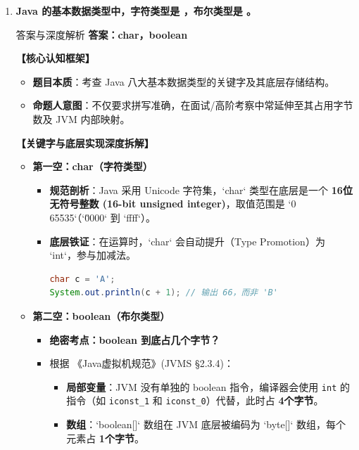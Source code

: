 \documentclass[12pt, a4paper]{ctexart}
\newcommand{\blank}{\underline{\hspace{3cm}}}
\begin{document}
\begin{enumerate}[label=\textbf{\arabic*.}]
	\item \textbf{Java 的基本数据类型中，字符类型是 \blank，布尔类型是 \blank。}

	      \begin{bluebox}{答案与深度解析}
		      \textbf{答案：char，boolean}

		      \textbf{【核心认知框架】}
		      \begin{itemize}[leftmargin=*, nosep]
			      \item \textbf{题目本质}：考查 Java 八大基本数据类型的关键字及其底层存储结构。
			      \item \textbf{命题人意图}：不仅要求拼写准确，在面试/高阶考察中常延伸至其占用字节数及 JVM 内部映射。
		      \end{itemize}

		      \textbf{【关键字与底层实现深度拆解】}
		      \begin{itemize}[leftmargin=*, nosep]

			      \item \textbf{第一空：char（字符类型）}
			            \begin{itemize}[leftmargin=*, nosep]
				            \item \textbf{规范剖析}：Java 采用 Unicode 字符集，`char` 类型在底层是一个 \textbf{16位无符号整数 (16-bit unsigned integer)}，取值范围是 `0 ~ 65535`（`\u0000` 到 `ffff`）。
				            \item \textbf{底层铁证}：在运算时，`char` 会自动提升（Type Promotion）为 `int`，参与加减法。
				                  \begin{lstlisting}[language=Java]
char c = 'A';
System.out.println(c + 1); // 输出 66，而非 'B'
                      \end{lstlisting}
			            \end{itemize}

			      \item \textbf{第二空：boolean（布尔类型）}
			            \begin{itemize}[leftmargin=*, nosep]
				            \item \textbf{绝密考点：boolean 到底占几个字节？}
				            \item 根据 《Java虚拟机规范》(JVMS §2.3.4)：
				                  \begin{itemize}
					                  \item \textbf{局部变量}：JVM 没有单独的 boolean 指令，编译器会使用 \texttt{int} 的指令（如 \texttt{iconst\_1} 和 \texttt{iconst\_0}）代替，此时占 \textbf{4个字节}。
					                  \item \textbf{数组}：`boolean[]` 数组在 JVM 底层被编码为 `byte[]` 数组，每个元素占 \textbf{1个字节}。
				                  \end{itemize}
			            \end{itemize}
		      \end{itemize}


\end{bluebox}
\end{enumerate}
\end{document}
